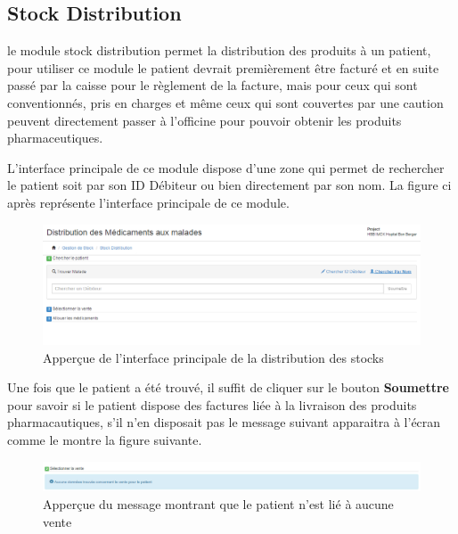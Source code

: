 \documentclass[12pt,a4paper]{report}
\begin{document}
\subsection{Stock Distribution}
le module stock distribution permet la distribution des produits à un patient, pour utiliser ce module le patient devrait premièrement être facturé et en suite passé par la caisse pour le règlement de la facture, mais pour ceux qui sont conventionnés, pris en charges et même ceux qui sont couvertes par une caution peuvent directement passer à l'officine pour pouvoir obtenir les produits pharmaceutiques.

L'interface principale de ce module dispose d'une zone qui permet de rechercher le patient soit par son ID Débiteur ou bien directement par son nom. La figure ci après représente l'interface principale de ce module.

\begin{figure}[h]
\begin{center}
\includegraphics[width=12cm]{pic/DistrMediMalade.png}
\end{center}
\caption{Apperçue de l'interface principale de la distribution des stocks}
\label{Apperçue de l'interface principale de la distribution des stocks}
\end{figure}

Une fois que le patient a été trouvé, il suffit de cliquer sur le bouton \textbf{Soumettre} pour savoir si le patient dispose des factures liée à la livraison des produits pharmacautiques, s'il n'en disposait pas le message suivant apparaitra à l'écran comme le montre la figure suivante.

\begin{figure}[h]
\begin{center}
\includegraphics[width=14cm]{pic/NoSaleFound.png}
\end{center}
\caption{Apperçue du message montrant que le patient n'est lié à aucune vente}
\label{Apperçue du message montrant que le patient n'est lié à aucune vente}
\end{figure}
\end{document}
